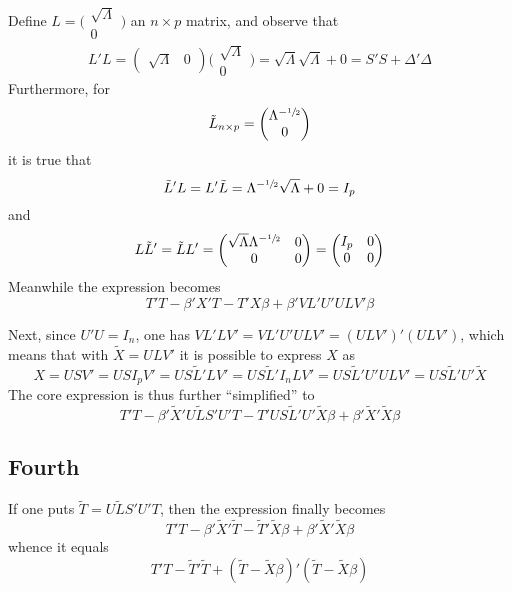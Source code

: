 \documentclass[a4paper]{article}
\begin{document}
Define $L = \big(\begin{smallmatrix} \sqrt{\Lambda} \\ 0 \end{smallmatrix}\big)$ an $n\times p$ matrix, and observe that
\[L'L = (\begin{smallmatrix}\sqrt{\Lambda} & 0\end{smallmatrix})\Big(\begin{smallmatrix}\sqrt{\Lambda} \\ 0\end{smallmatrix}\Big) = \sqrt{\Lambda}\sqrt{\Lambda} + 0 = S'S + \Delta'\Delta\]
Furthermore, for
\[\tilde{L}_{n\times p} = \bigg(\begin{matrix}\Lambda^{-\sfrac{1}{2}} \\ 0\end{matrix}\bigg)\]
it is true that
\[\tilde{L}'L = L'\tilde{L} = \Lambda^{-\sfrac{1}{2}} \sqrt{\Lambda} + 0 = I_p\]
and
\[L\tilde{L}' = \tilde{L} L'= \bigg(\begin{matrix} \sqrt{\Lambda}\Lambda^{-\sfrac{1}{2}} & 0 \\ 0 & 0\end{matrix}\bigg) = \bigg(\begin{matrix} I_p & 0 \\ 0 & 0\end{matrix}\bigg)\]
Meanwhile the expression becomes
\[T'T - \beta'X'T - T'X\beta + \beta'VL'U'ULV'\beta \]

Next, since $U'U = I_n$, one has $VL'LV' = VL'U'ULV' = (ULV')'(ULV')$, which means that with $\tilde{X} = ULV'$ it is possible to express $X$ as
\[X = USV' = USI_pV' = US\tilde{L}'LV' = US\tilde{L}'I_nLV' = US\tilde{L}'U'ULV' = US\tilde{L}'U'\tilde{X}\]
The core expression is thus further ``simplified'' to
\[T'T - \beta'\tilde{X}'U\tilde{L}S'U'T - T'US\tilde{L}'U'\tilde{X}\beta + \beta'\tilde{X}'\tilde{X}\beta \]


\subsection*{Fourth} %
\label{sub:fourth}
If one puts $\tilde{T} = U\tilde{L}S'U'T$, then the expression finally becomes
\[T'T - \beta'\tilde{X}'\tilde{T} - \tilde{T}'\tilde{X}\beta + \beta'\tilde{X}'\tilde{X}\beta\]
whence it equals
\[ T'T - \tilde{T}'\tilde{T} + (\tilde{T} - \tilde{X}\beta)'(\tilde{T} - \tilde{X}\beta) \]
\end{document}
